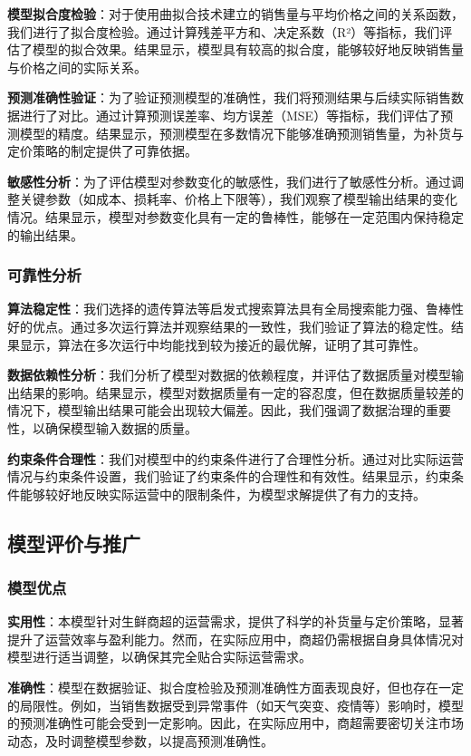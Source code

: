 \documentclass{cumcmthesis}
\begin{document}
\textbf{模型拟合度检验}：对于使用曲拟合技术建立的销售量与平均价格之间的关系函数，我们进行了拟合度检验。通过计算残差平方和、决定系数（R²）等指标，我们评估了模型的拟合效果。结果显示，模型具有较高的拟合度，能够较好地反映销售量与价格之间的实际关系。

\textbf{预测准确性验证}：为了验证预测模型的准确性，我们将预测结果与后续实际销售数据进行了对比。通过计算预测误差率、均方误差（MSE）等指标，我们评估了预测模型的精度。结果显示，预测模型在多数情况下能够准确预测销售量，为补货与定价策略的制定提供了可靠依据。

\textbf{敏感性分析}：为了评估模型对参数变化的敏感性，我们进行了敏感性分析。通过调整关键参数（如成本、损耗率、价格上下限等），我们观察了模型输出结果的变化情况。结果显示，模型对参数变化具有一定的鲁棒性，能够在一定范围内保持稳定的输出结果。

\subsubsection{可靠性分析}

\textbf{算法稳定性}：我们选择的遗传算法等启发式搜索算法具有全局搜索能力强、鲁棒性好的优点。通过多次运行算法并观察结果的一致性，我们验证了算法的稳定性。结果显示，算法在多次运行中均能找到较为接近的最优解，证明了其可靠性。

\textbf{数据依赖性分析}：我们分析了模型对数据的依赖程度，并评估了数据质量对模型输出结果的影响。结果显示，模型对数据质量有一定的容忍度，但在数据质量较差的情况下，模型输出结果可能会出现较大偏差。因此，我们强调了数据治理的重要性，以确保模型输入数据的质量。

\textbf{约束条件合理性}：我们对模型中的约束条件进行了合理性分析。通过对比实际运营情况与约束条件设置，我们验证了约束条件的合理性和有效性。结果显示，约束条件能够较好地反映实际运营中的限制条件，为模型求解提供了有力的支持。

\subsection{模型评价与推广}
\subsubsection{模型优点}
\textbf{实用性}：本模型针对生鲜商超的运营需求，提供了科学的补货量与定价策略，显著提升了运营效率与盈利能力。然而，在实际应用中，商超仍需根据自身具体情况对模型进行适当调整，以确保其完全贴合实际运营需求。

\textbf{准确性}：模型在数据验证、拟合度检验及预测准确性方面表现良好，但也存在一定的局限性。例如，当销售数据受到异常事件（如天气突变、疫情等）影响时，模型的预测准确性可能会受到一定影响。因此，在实际应用中，商超需要密切关注市场动态，及时调整模型参数，以提高预测准确性。
\end{document}
